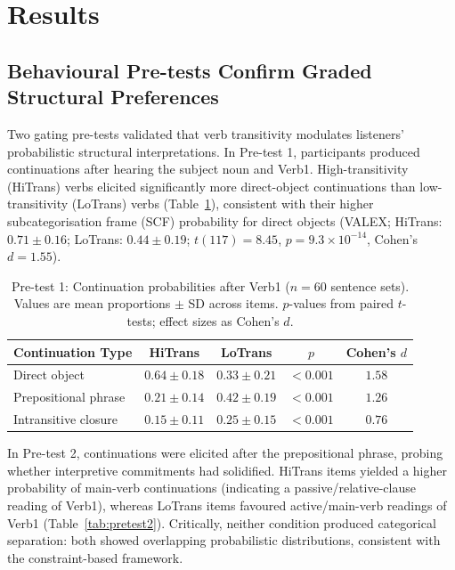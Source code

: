 \documentclass[11pt]{article}
\begin{document}
\section{Results}

\subsection{Behavioural Pre-tests Confirm Graded Structural Preferences}

Two gating pre-tests validated that verb transitivity modulates listeners' probabilistic structural interpretations. In Pre-test 1, participants produced continuations after hearing the subject noun and Verb1. High-transitivity (HiTrans) verbs elicited significantly more direct-object continuations than low-transitivity (LoTrans) verbs (Table~\ref{tab:pretest1}), consistent with their higher subcategorisation frame (SCF) probability for direct objects (VALEX; HiTrans: $0.71 \pm 0.16$; LoTrans: $0.44 \pm 0.19$; $t(117) = 8.45$, $p = 9.3 \times 10^{-14}$, Cohen's $d = 1.55$).

\begin{table}[H]
\centering
\caption{Pre-test 1: Continuation probabilities after Verb1 ($n = 60$ sentence sets). Values are mean proportions $\pm$ SD across items. $p$-values from paired $t$-tests; effect sizes as Cohen's $d$.}
\label{tab:pretest1}
\begin{tabular}{lcccc}
\toprule
Continuation Type & HiTrans & LoTrans & $p$ & Cohen's $d$ \\
\midrule
Direct object & $0.64 \pm 0.18$ & $0.33 \pm 0.21$ & $< 0.001$ & $1.58$ \\
Prepositional phrase & $0.21 \pm 0.14$ & $0.42 \pm 0.19$ & $< 0.001$ & $1.26$ \\
Intransitive closure & $0.15 \pm 0.11$ & $0.25 \pm 0.15$ & $< 0.001$ & $0.76$ \\
\bottomrule
\end{tabular}
\end{table}

In Pre-test 2, continuations were elicited after the prepositional phrase, probing whether interpretive commitments had solidified. HiTrans items yielded a higher probability of main-verb continuations (indicating a passive/relative-clause reading of Verb1), whereas LoTrans items favoured active/main-verb readings of Verb1 (Table~\ref{tab:pretest2}). Critically, neither condition produced categorical separation: both showed overlapping probabilistic distributions, consistent with the constraint-based framework.
\end{document}
